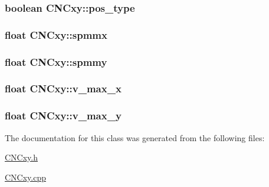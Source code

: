 \hypertarget{class_c_n_cxy_a045b5a37ac46c097865761673da78784}{
\subsubsection[{pos\+\_\+type}]{\setlength{\rightskip}{0pt plus 5cm}boolean C\+N\+Cxy\+::pos\+\_\+type\hspace{0.3cm}{\ttfamily [private]}}}\label{class_c_n_cxy_a045b5a37ac46c097865761673da78784}
\hypertarget{class_c_n_cxy_a3707e01e2d9c655ceb51e6cb92f07bc4}{
\subsubsection[{spmmx}]{\setlength{\rightskip}{0pt plus 5cm}float C\+N\+Cxy\+::spmmx\hspace{0.3cm}{\ttfamily [private]}}}\label{class_c_n_cxy_a3707e01e2d9c655ceb51e6cb92f07bc4}
\hypertarget{class_c_n_cxy_a3bdb499bf61a7b3de964626d54e842e5}{
\subsubsection[{spmmy}]{\setlength{\rightskip}{0pt plus 5cm}float C\+N\+Cxy\+::spmmy\hspace{0.3cm}{\ttfamily [private]}}}\label{class_c_n_cxy_a3bdb499bf61a7b3de964626d54e842e5}
\hypertarget{class_c_n_cxy_a35226c5b9864068017c23c0d587baf6c}{
\subsubsection[{v\+\_\+max\+\_\+x}]{\setlength{\rightskip}{0pt plus 5cm}float C\+N\+Cxy\+::v\+\_\+max\+\_\+x\hspace{0.3cm}{\ttfamily [private]}}}\label{class_c_n_cxy_a35226c5b9864068017c23c0d587baf6c}
\hypertarget{class_c_n_cxy_a90f4339997565bd4e336fbfe48496c92}{
\subsubsection[{v\+\_\+max\+\_\+y}]{\setlength{\rightskip}{0pt plus 5cm}float C\+N\+Cxy\+::v\+\_\+max\+\_\+y\hspace{0.3cm}{\ttfamily [private]}}}\label{class_c_n_cxy_a90f4339997565bd4e336fbfe48496c92}


The documentation for this class was generated from the following files\+:\begin{DoxyCompactItemize}
\item 
\hyperlink{_c_n_cxy_8h}{C\+N\+Cxy.\+h}\item 
\hyperlink{_c_n_cxy_8cpp}{C\+N\+Cxy.\+cpp}\end{DoxyCompactItemize}
